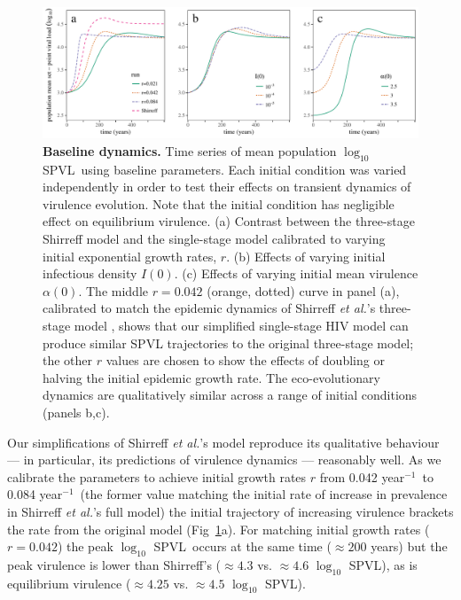 \documentclass[10pt,letterpaper]{article}
\renewcommand{\figurename}{Fig}
\newcommand{\Lspvl}{$\log_{10}$ SPVL}
\newcommand{\etal}{\textit{et al.}}
\newcommand{\peryear}{year$^{-1}$}
\begin{document}
\begin{figure}[!ht]
\includegraphics[width=\textwidth]{../figures/fig1.pdf}
\caption{{\bf Baseline dynamics.}
Time series of mean population \Lspvl\ using baseline parameters. Each initial condition was varied independently in order to test their effects on transient dynamics of virulence evolution. Note that the initial condition has negligible effect on equilibrium virulence.
(a) Contrast between the three-stage Shirreff model and the single-stage model calibrated to varying initial exponential growth rates, $r$.
(b) Effects of varying initial infectious density $I(0)$.
(c) Effects of varying initial mean virulence $\alpha(0)$.
The middle $r=0.042$ (orange, dotted) curve in panel (a), calibrated to match the epidemic dynamics of Shirreff \etal's three-stage model \cite{shirreff_transmission_2011}, shows that our simplified single-stage HIV model can produce similar SPVL trajectories to the original three-stage model; the other $r$ values are chosen to show the effects of doubling or halving the initial epidemic growth rate. 
The eco-evolutionary dynamics are qualitatively similar
across a range of initial conditions (panels b,c).}
\label{fig:panel3}
\end{figure}

Our simplifications of Shirreff \etal's model \cite{shirreff_transmission_2011} reproduce its qualitative behaviour --- in particular, its predictions of virulence dynamics --- reasonably well. As we calibrate the parameters to achieve initial growth rates $r$ from 0.042 \peryear\ to 0.084 \peryear\ (the former value matching the initial rate of increase in prevalence in Shirreff \etal's full model) the initial trajectory of increasing virulence brackets the rate from the original model (\figurename~\ref{fig:panel3}a). 
For matching initial growth rates ($r=0.042$)
the peak \Lspvl\ occurs at the same time ($\approx 200$ years)
but the peak virulence is lower than 
Shirreff's ($\approx 4.3$ vs. $\approx 4.6$ \Lspvl),
as is equilibrium virulence ($\approx 4.25$ vs. $\approx 4.5$ \Lspvl).
\end{document}

